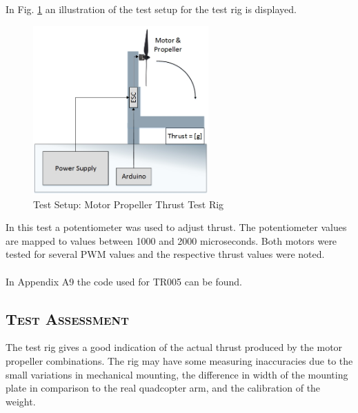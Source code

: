 In Fig. \ref{fig:TestSetup5} an illustration of the test setup for the test rig is displayed.
\begin{figure}[H]
    \centering
    \includegraphics[width = 0.6\textwidth]{VAPIQ-PICTURES/ThrustTestRig}
    \caption{Test Setup: Motor Propeller Thrust Test Rig}
    \label{fig:TestSetup5}
\end{figure}
In this test a potentiometer was used to adjust thrust. The potentiometer values are mapped to values between 1000 and 2000 microseconds. Both motors were tested for several PWM values and the respective thrust values were noted.\\
\\
In Appendix A9 the code used for TR005 can be found. 

\subsection*{\textsc{\medium Test Assessment}}
The test rig gives a good indication of the actual thrust produced by the motor propeller combinations. The rig may have some measuring inaccuracies due to the small variations in mechanical mounting, the difference in width of the mounting plate in comparison to the real quadcopter arm, and the calibration of the weight.

